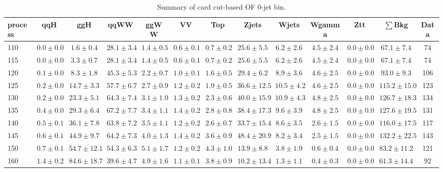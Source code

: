 \begin{table}[!htb]
{}
\caption{Summary of card cut-based OF 0-jet bin.}
{%
 \tiny
 \begin{center}
 \begin{tabular}{l | c c | c c c c c c c c  | c c}
 \hline
 process & qqH & ggH & qqWW & ggWW & VV & Top & Zjets & Wjets & Wgamma & Ztt & $\sum$Bkg & Data \\
\hline
110 & $0.0\pm0.0$ & $1.6\pm0.4$ & $28.1\pm3.4$ & $1.4\pm0.5$ & $0.6\pm0.1$ & $0.7\pm0.2$ & $25.6\pm5.5$ & $6.2\pm2.6$ & $4.5\pm2.4$ & $0.0\pm0.0$ & $67.1\pm7.4$ & 74 \\
115 & $0.0\pm0.0$ & $3.3\pm0.7$ & $28.1\pm3.4$ & $1.4\pm0.5$ & $0.6\pm0.1$ & $0.7\pm0.2$ & $25.6\pm5.5$ & $6.2\pm2.6$ & $4.5\pm2.4$ & $0.0\pm0.0$ & $67.1\pm7.4$ & 74 \\
120 & $0.1\pm0.0$ & $8.3\pm1.8$ & $45.3\pm5.3$ & $2.2\pm0.7$ & $1.0\pm0.1$ & $1.6\pm0.5$ & $29.4\pm6.2$ & $8.9\pm3.6$ & $4.6\pm2.5$ & $0.0\pm0.0$ & $93.0\pm9.3$ & 106 \\
125 & $0.2\pm0.0$ & $14.7\pm3.3$ & $57.7\pm6.7$ & $2.7\pm0.9$ & $1.2\pm0.2$ & $1.9\pm0.5$ & $36.6\pm12.5$ & $10.5\pm4.2$ & $4.6\pm2.5$ & $0.0\pm0.0$ & $115.2\pm15.0$ & 123 \\
130 & $0.2\pm0.0$ & $23.3\pm5.1$ & $64.3\pm7.4$ & $3.1\pm1.0$ & $1.3\pm0.2$ & $2.3\pm0.6$ & $40.0\pm15.9$ & $10.9\pm4.3$ & $4.8\pm2.5$ & $0.0\pm0.0$ & $126.7\pm18.3$ & 134 \\
135 & $0.4\pm0.0$ & $29.3\pm6.4$ & $67.2\pm7.7$ & $3.4\pm1.1$ & $1.4\pm0.2$ & $2.8\pm0.8$ & $38.4\pm17.3$ & $9.6\pm3.9$ & $4.8\pm2.5$ & $0.0\pm0.0$ & $127.6\pm19.5$ & 131 \\
140 & $0.5\pm0.1$ & $36.1\pm7.8$ & $63.8\pm7.2$ & $3.5\pm1.1$ & $1.2\pm0.2$ & $2.6\pm0.7$ & $33.7\pm15.4$ & $8.6\pm3.5$ & $2.6\pm1.5$ & $0.0\pm0.0$ & $116.0\pm17.5$ & 117 \\
145 & $0.6\pm0.1$ & $44.9\pm9.7$ & $64.2\pm7.3$ & $4.0\pm1.3$ & $1.4\pm0.2$ & $3.6\pm0.9$ & $48.4\pm20.9$ & $8.2\pm3.4$ & $2.5\pm1.5$ & $0.0\pm0.0$ & $132.2\pm22.5$ & 143 \\
150 & $0.7\pm0.1$ & $54.7\pm12.1$ & $54.3\pm6.3$ & $5.1\pm1.7$ & $1.2\pm0.2$ & $4.3\pm1.0$ & $13.9\pm8.8$ & $3.8\pm1.9$ & $0.6\pm0.4$ & $0.0\pm0.0$ & $83.2\pm11.2$ & 121 \\
160 & $1.4\pm0.2$ & $84.6\pm18.7$ & $39.6\pm4.7$ & $4.9\pm1.6$ & $1.1\pm0.1$ & $3.8\pm0.9$ & $10.2\pm13.4$ & $1.3\pm1.1$ & $0.4\pm0.3$ & $0.0\pm0.0$ & $61.3\pm14.4$ & 92 \\

\end{tabular}
\end{center}}
\end{table}
